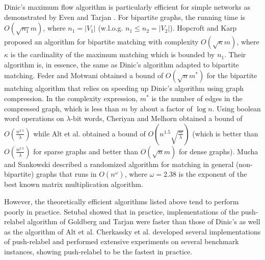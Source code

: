 \documentclass{article}
\begin{document}
Dinic's \cite{Din70} maximum flow algorithm is particularly efficient for simple networks as demonstrated by Even and Tarjan \cite{EveT75}. For bipartite graphs, the running time is $O(\sqrt{n_1}m)$, where $n_1 = |V_1|$ (w.l.o.g. $n_1 \leq n_2=|V_2|$).  Hopcroft and Karp \cite{HopK73} proposed an algorithm for bipartite matching with complexity $O(\sqrt{\kappa}m)$, where $\kappa$ is the cardinality of the maximum matching which is bounded by $n_1$. Their algorithm is, in essence, the same as Dinic's algorithm adapted to bipartite matching. Feder and Motwani \cite{FedM91} obtained a bound of $O(\sqrt{n}m^{*})$ for the bipartite matching algorithm that relies on speeding up Dinic's algorithm using graph compression. In the complexity expression, $m^{*}$ is the number of edges in the compressed graph, which is less than $m$ by about a factor of $\log n$.  Using boolean word operations on $\lambda$-bit words, Cheriyan and Melhorn \cite{CheM96} obtained a bound of $O(\frac{n^{2.5}}{\lambda})$ while Alt et al. \cite{AltBMP91} obtained a bound of $O(n^{1.5}\sqrt{\frac{m}{\lambda}})$ (which is better than $O(\frac{n^{2.5}}{\lambda})$ for sparse graphs and better than $O(\sqrt{n}m)$ for dense graphs).  Mucha and Sankowski \cite{MucS04} described a randomized algorithm for matching in general (non-bipartite) graphs that runs in $O(n^\omega)$, where $\omega=2.38$ is the exponent of the best known matrix multiplication algorithm.

However, the theoretically efficient algorithms listed above tend to perform poorly in practice. Setubal \cite{Set93, Set96} showed that in practice, implementations of the push-relabel algorithm of Goldberg and Tarjan \cite{GolT88} were faster than those of Dinic's as well as the algorithm of Alt et al.  Cherkassky et al. \cite{CheGMSS98} developed several implementations of push-relabel and performed extensive experiments on several benchmark instances, showing push-relabel to be the fastest in practice.
\end{document}
